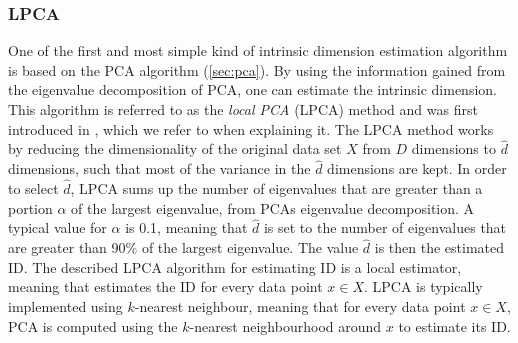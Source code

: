 \subsubsection{LPCA}
\label{sec:id-estimation-lpca}
One of the first and most simple kind of intrinsic dimension estimation algorithm is based on the PCA algorithm (\cref{sec:pca}). By using the information gained from the eigenvalue decomposition of PCA, one can estimate the intrinsic dimension. This algorithm is referred to as the \textit{local PCA} (LPCA) method and was first introduced in \cite{Fukunaga1971}, which we refer to when explaining it. The LPCA method works by reducing the dimensionality of the original data set $X$ from $D$ dimensions to $\hat{d}$ dimensions, such that most of the variance in the $\hat{d}$ dimensions are kept. In order to select $\hat{d}$, LPCA sums up the number of eigenvalues that are greater than a portion $\alpha$ of the largest eigenvalue, from PCAs eigenvalue decomposition. A typical value for $\alpha$ is 0.1, meaning that $\hat{d}$ is set to the number of eigenvalues that are greater than 90\% of the largest eigenvalue. The value $\hat{d}$ is then the estimated ID. The described LPCA algorithm for estimating ID is a local estimator, meaning that estimates the ID for every data point $x \in X$. LPCA is typically implemented using $k$-nearest neighbour, meaning that for every data point $x \in X$, PCA is computed using the $k$-nearest neighbourhood around $x$ to estimate its ID.

